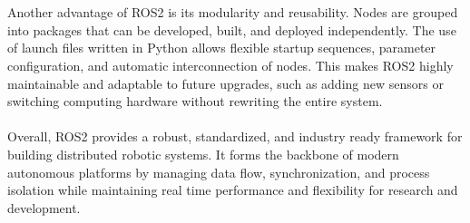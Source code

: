 \\ \\
Another advantage of ROS2 is its modularity and reusability. Nodes are grouped into packages that can be developed, built, and deployed independently. The use of launch files written in Python allows flexible startup sequences, parameter configuration, and automatic interconnection of nodes. This makes ROS2 highly maintainable and adaptable to future upgrades, such as adding new sensors or switching computing hardware without rewriting the entire system.  
\\ \\
Overall, ROS2 provides a robust, standardized, and industry ready framework for building distributed robotic systems. It forms the backbone of modern autonomous platforms by managing data flow, synchronization, and process isolation while maintaining real time performance and flexibility for research and development.
